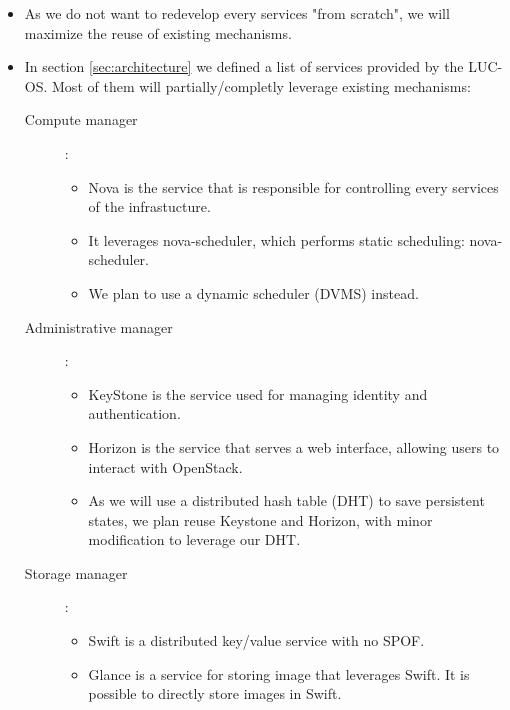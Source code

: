 \begin{itemize}

	\item As we do not want to redevelop every services "from scratch", we will
	maximize the reuse of existing	mechanisms.

	\item In section \ref{sec:architecture} we defined a list of services provided 
	by the LUC-OS. Most of them will partially/completly leverage existing 
	mechanisms:

		\begin{description}

			\item [Compute manager] : 
			\begin{itemize}
				\item Nova is the service that is responsible for controlling 
				every services of the infrastucture. 

				\item It leverages nova-scheduler, which performs static 
				scheduling: nova-scheduler.

				\item We plan to use a dynamic scheduler (DVMS) instead.
			\end{itemize}

			\item [Administrative manager] : 
			\begin{itemize}
				\item KeyStone is the service used for managing identity and
				authentication.

				\item Horizon is the service that serves a web interface, 
				allowing users to interact with OpenStack.

				\item As we will use a distributed hash table (DHT) to save
				persistent states, we plan reuse Keystone and Horizon, with
				minor modification to leverage our DHT. 
			\end{itemize}

			\item [Storage manager] : 
			\begin{itemize}
				\item Swift is a distributed key/value service with no SPOF.
				
				\item Glance is a service for storing image that leverages 
				Swift. It is possible to directly store images in Swift.


\end{itemize}
\end{description}
\end{itemize}
